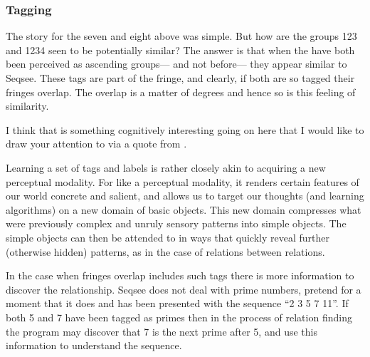 \subsubsection{Tagging}

The story for the seven and eight above was simple.  But how are the groups 123 and 1234 seen to be potentially similar?  The answer is that when the have both been perceived as ascending groups--- and not before--- they appear similar to Seqsee.  These tags are part of the fringe, and clearly, if both are so tagged their fringes overlap.  The overlap is a matter of degrees and hence so is this feeling of similarity.

I think that is something cognitively interesting going on here that I would like to draw your attention to via a quote from \cite{Clark:MindWare}.

Learning a set of tags and labels is rather closely akin to acquiring a new perceptual modality.  For like a perceptual modality, it renders certain features of our world concrete and salient, and allows us to target our thoughts (and learning algorithms) on a new domain of basic objects.  This new domain compresses what were previously complex and unruly sensory patterns into simple objects.  The simple objects can then be attended to in ways that quickly reveal further (otherwise hidden) patterns, as in the case of relations between relations.

In the case when fringes overlap includes such tags there is more information to discover the relationship.  Seqsee does not deal with prime numbers, pretend for a moment that it does and has been presented with the sequence ``2 3 5 7 11''. If both 5 and 7 have been tagged as primes then in the process of relation finding the program may discover that 7 is the next prime after 5, and use this information to understand the sequence.


%
%
%
